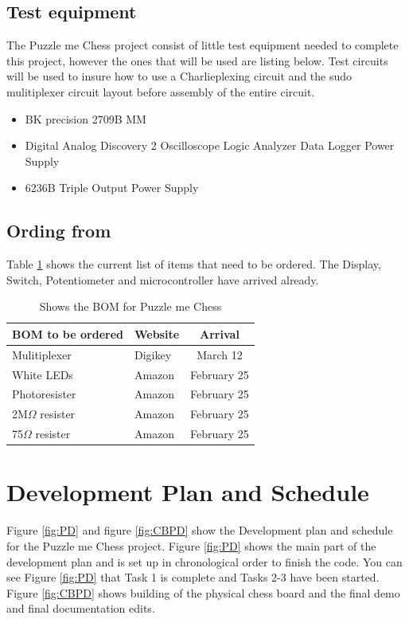 \documentclass[11pt]{article}
\begin{document}
\subsection{Test equipment}
The Puzzle me Chess project consist of little test equipment needed to complete this project, however the ones that will be used are listing below. Test circuits will be used to insure how to use a Charlieplexing circuit and the sudo mulitiplexer circuit layout before assembly of the entire circuit. 
\begin{itemize}
\item BK precision 2709B MM
\item Digital Analog Discovery 2
\subitem Oscilloscope
\subitem Logic Analyzer
\subitem Data Logger
\subitem Power Supply
\item 6236B Triple Output Power Supply 

\end{itemize}

\subsection{Ording from}
Table \ref{tab:ording} shows the current list of items that need to be ordered. The Display, Switch, Potentiometer and microcontroller have arrived already. 

\begin{table}[H]
\begin{center}
    \begin{tabular}{| l | l | c |}
    \hline
    BOM to be ordered  & Website & Arrival \\ \hline
    Mulitiplexer & Digikey & March 12 \\ \hline 
    White LEDs & Amazon & February 25 \\ \hline
    Photoresister & Amazon & February 25 \\ \hline
    2M$\Omega$ resister & Amazon & February 25 \\ \hline
    75$\Omega$ resister & Amazon  & February 25 \\ \hline
    \end{tabular}
    \caption{Shows the BOM for Puzzle me Chess}
	\label{tab:ording}
\end{center}
\end{table}

\section{Development Plan and Schedule}
Figure \ref{fig:PD} and figure \ref{fig:CBPD} show the Development plan and schedule for the Puzzle me Chess project. Figure \ref{fig:PD} shows the main part of the development plan and is set up in chronological order to finish the code. You can see Figure \ref{fig:PD} that Task 1 is complete and Tasks 2-3 have been started. Figure \ref{fig:CBPD} shows building of the physical chess board and the final demo and final documentation edits. 
\end{document}
